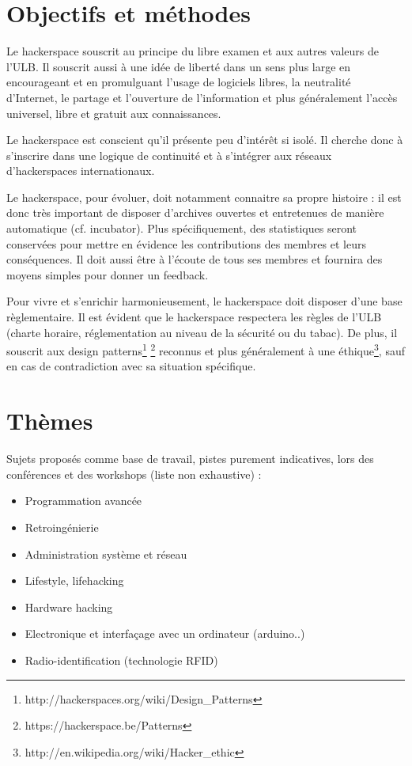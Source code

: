 \documentclass{article}
\begin{document}
\section{Objectifs et méthodes}

Le hackerspace souscrit au principe du libre examen et aux autres valeurs de l'ULB.
Il souscrit aussi à une idée de liberté dans un sens plus large en encourageant et en promulguant l'usage de logiciels libres, la neutralité d'Internet, le partage et l'ouverture de 
l'information et plus généralement l'accès universel, libre et gratuit aux connaissances.

Le hackerspace est conscient qu'il présente peu d'intérêt si isolé. Il cherche donc 
à s'inscrire dans une logique de continuité et à s'intégrer aux réseaux d'hackerspaces 
internationaux.

Le hackerspace, pour évoluer, doit notamment connaitre sa propre histoire : il est 
donc très important de disposer d'archives ouvertes et entretenues de manière 
automatique (cf. incubator). Plus spécifiquement, des statistiques seront 
conservées pour mettre en évidence les contributions des membres et leurs conséquences. 
Il doit aussi être à l'écoute de tous ses membres et fournira des moyens simples pour 
donner un feedback. 

Pour vivre et s'enrichir harmonieusement, le hackerspace doit disposer d'une base 
règlementaire. Il est évident que le hackerspace respectera les règles de l'ULB 
(charte horaire, réglementation au niveau de la sécurité ou du tabac). De plus, il souscrit aux 
design patterns\footnote{http://hackerspaces.org/wiki/Design\_Patterns}
\footnote{https://hackerspace.be/Patterns} reconnus et plus généralement à une 
éthique\footnote{http://en.wikipedia.org/wiki/Hacker\_ethic}, sauf en cas de 
contradiction avec sa situation spécifique.


\section{Thèmes}

Sujets proposés comme base de travail, pistes purement indicatives, lors des 
conférences et des workshops (liste non exhaustive) :
\begin{itemize}
\item Programmation avancée
\item Retroingénierie
\item Administration système et réseau
\item Lifestyle, lifehacking
\item Hardware hacking
\item Electronique et interfaçage avec un ordinateur (arduino..)
\item Radio-identification (technologie RFID)
\end{itemize}
\end{document}
